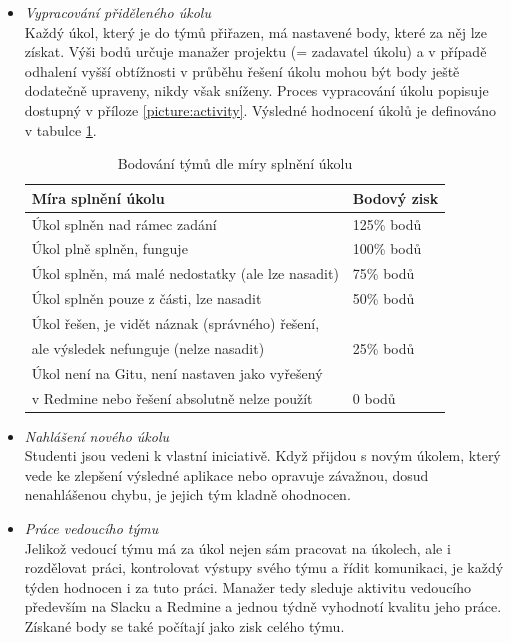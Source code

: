\begin{itemize}
	\item \emph{Vypracování přiděleného úkolu}\\Každý úkol, který je do týmů přiřazen, má nastavené body, které za něj lze získat. Výši bodů určuje manažer projektu (= zadavatel úkolu) a v případě odhalení vyšší obtížnosti v průběhu řešení úkolu mohou být body ještě dodatečně upraveny, nikdy však sníženy. Proces vypracování úkolu popisuje  dostupný v příloze \ref{picture:activity}. Výsledné hodnocení úkolů je definováno v tabulce \ref{table:ranking}.
	\begin{table}[h]
		\caption{Bodování týmů dle míry splnění úkolu}
		\label{table:ranking}
		\begin{tabular}{@{}ll@{}}
			\toprule
			Míra splnění úkolu                                                                           & Bodový zisk \\ \midrule
			Úkol splněn nad rámec zadání                                                                 & 125\% bodů  \\
			Úkol plně splněn, funguje                                                                    & 100\% bodů  \\
			Úkol splněn, má malé nedostatky (ale lze nasadit)                                            & 75\% bodů   \\
			Úkol splněn pouze z části, lze nasadit                                                       & 50\% bodů   \\
			Úkol řešen, je vidět náznak (správného) řešení,\\ale výsledek nefunguje (nelze nasadit)      & 25\% bodů   \\
			Úkol není na Gitu, není nastaven jako vyřešený\\v Redmine nebo řešení absolutně nelze použít & 0 bodů   \\ \bottomrule
		\end{tabular}
	\end{table}
	\item \emph{Nahlášení nového úkolu}\\Studenti jsou vedeni k vlastní iniciativě. Když přijdou s novým úkolem, který vede ke zlepšení výsledné aplikace nebo opravuje závažnou, dosud nenahlášenou chybu, je jejich tým kladně ohodnocen.
	\item \emph{Práce vedoucího týmu}\\Jelikož vedoucí týmu má za úkol nejen sám pracovat na úkolech, ale i rozdělovat práci, kontrolovat výstupy svého týmu a řídit komunikaci, je každý týden hodnocen i za tuto práci. Manažer tedy sleduje aktivitu vedoucího především na Slacku a Redmine a jednou týdně vyhodnotí kvalitu jeho práce. Získané body se také počítají jako zisk celého týmu.
\end{itemize}


